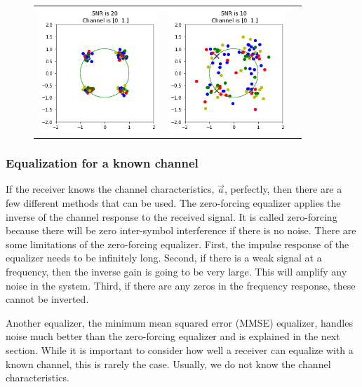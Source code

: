 \begin{figure}
\begin{tabular}{ccc}
    \includegraphics[width=45mm]{figures/equal_intro/snr_20_c5/cfo_0.png}&
    \includegraphics[width=45mm]{figures/equal_intro/snr_10_c5/cfo_0.png}\\
  \end{tabular}
  \label{fig:multi_tap}
\end{figure}

\subsubsection{Equalization for a known channel}

If the receiver knows the channel characteristics, $\vec{a}$, perfectly, then there are a few different methods that can be used.  
The zero-forcing equalizer applies the inverse of the channel response to the received signal.  It is called zero-forcing because there will be zero inter-symbol interference if there is no noise.
There are some limitations of the zero-forcing equalizer. 
First, the impulse response of the equalizer needs to be infinitely long. 
Second, if there is a weak signal at a frequency, then the inverse gain is going to be very large.  This will amplify any noise in the system. 
Third, if there are any zeros in the frequency response, these cannot be inverted.

Another equalizer, the minimum mean squared error (MMSE) equalizer, handles noise much better than the zero-forcing equalizer and is explained in the next section.
While it is important to consider how well a receiver can equalize with a known channel, this is rarely the case.  Usually, we do not know the channel characteristics.

